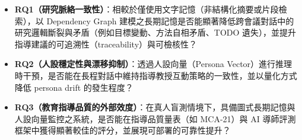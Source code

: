 \begin{itemize}

  \item \textbf{RQ1（研究脈絡一致性）}：相較於僅使用文字記憶（非結構化摘要或片段檢索），以 Dependency Graph 建模之長期記憶是否能顯著降低跨會議對話中的研究邏輯斷裂與矛盾（例如目標變動、方法自相矛盾、TODO 遺失），並提升指導建議的可追溯性（traceability）與可檢核性？
  \item \textbf{RQ2（人設穩定性與漂移抑制）}：透過人設向量（Persona Vector）進行推理時干預，是否能在長程對話中維持指導教授互動策略的一致性，並以量化方式降低 persona drift 的發生程度？
  \item \textbf{RQ3（教育指導品質的外部效度）}：在真人盲測情境下，具備圖式長期記憶與人設向量監控之系統，是否能在指導品質量表（如 MCA-21）與 AI 導師評測框架中獲得顯著較佳的評分，並展現可部署的可靠性提升？
\end{itemize}
